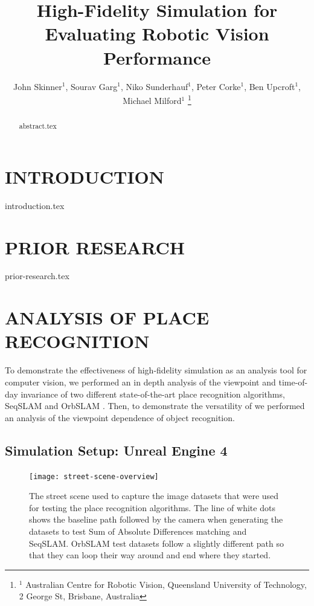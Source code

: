 \documentclass[letterpaper, 10 pt, conference]{ieeeconf}  %
\title{\LARGE \bf
High-Fidelity Simulation for Evaluating Robotic Vision Performance
}
\author{John Skinner$^{1}$, Sourav Garg$^{1}$, Niko Sunderhauf$^{1}$, Peter Corke$^{1}$, Ben Upcroft$^{1}$, Michael Milford$^{1}$%
\thanks{$^{1}$ Australian Centre for Robotic Vision,
        Queensland University of Technology,
        2 George St, Brisbane, Australia}%
}
\begin{document}
\maketitle
\thispagestyle{empty}
\pagestyle{empty}


\begin{abstract}

{abstract.tex}

\end{abstract}


\section{INTRODUCTION}

{introduction.tex}

\section{PRIOR RESEARCH}

{prior-research.tex}

\section{ANALYSIS OF PLACE RECOGNITION}

To demonstrate the effectiveness of high-fidelity simulation as an analysis tool for computer vision, we performed an in depth analysis of the viewpoint and time-of-day invariance of two different state-of-the-art place recognition algorithms, SeqSLAM \cite{Milford2012} and OrbSLAM \cite{Montiel2015}. Then, to demonstrate the versatility of we performed an analysis of the viewpoint dependence of object recognition.

\subsection{Simulation Setup: Unreal Engine 4}

\begin{figure}[t]
    \texttt{[image: street-scene-overview]}
    \caption{The street scene used to capture the image datasets that were used for testing the place recognition algorithms. The line of white dots shows the baseline path followed by the camera when generating the datasets to test Sum of Absolute Differences matching and SeqSLAM. OrbSLAM test datasets follow a slightly different path so that they can loop their way around and end where they started.}
    \label{fig:street-scene-overview}
\end{figure}
\end{document}
